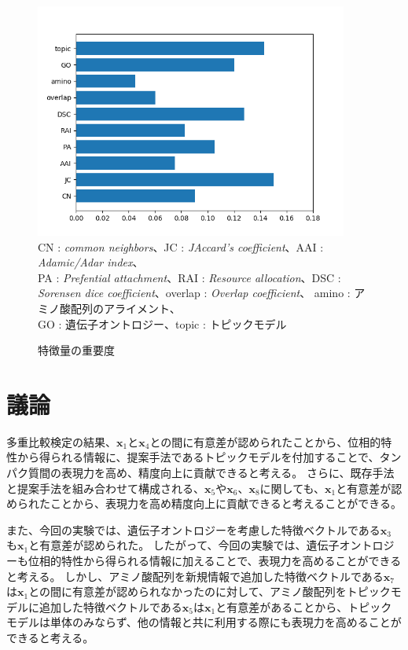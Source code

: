 \documentclass[titlepage,12pt]{jreport}
\begin{document}
\begin{figure}[htbp]
	\begin{center}
	\caption{特徴量の重要度}
		\includegraphics[width = 103mm]{img/feature_importance.png}
	\label{fig:feature-importance}
		\\ {\footnotesize CN : {\it common neighbors}、JC : {\it JAccard's coefficient}、AAI : {\it Adamic/Adar index}、\\PA : {\it Prefential attachment}、RAI : {\it Resource allocation}、DSC : {\it Sorensen dice coefficient}、overlap : {\it Overlap coefficient}、 amino : アミノ酸配列のアライメント、\\GO : 遺伝子オントロジー、topic : トピックモデル}
	\end{center}
\end{figure}

\section{議論\label{discussion}}
多重比較検定の結果、$\bm{x}_1$と$\bm{x}_4$との間に有意差が認められたことから、位相的特性から得られる情報に、提案手法であるトピックモデルを付加することで、タンパク質間の表現力を高め、精度向上に貢献できると考える。 さらに、既存手法と提案手法を組み合わせて構成される、$\bm{x}_5$や$\bm{x}_6$、$\bm{x}_8$に関しても、$\bm{x}_1$と有意差が認められたことから、表現力を高め精度向上に貢献できると考えることができる。

また、今回の実験では、遺伝子オントロジーを考慮した特徴ベクトルである$\bm{x}_3$も$\bm{x}_1$と有意差が認められた。  したがって、今回の実験では、遺伝子オントロジーも位相的特性から得られる情報に加えることで、表現力を高めることができると考える。 しかし、アミノ酸配列を新規情報で追加した特徴ベクトルである$\bm{x}_7$は$\bm{x}_1$との間に有意差が認められなかったのに対して、アミノ酸配列をトピックモデルに追加した特徴ベクトルである$\bm{x}_5$は$\bm{x}_1$と有意差があることから、トピックモデルは単体のみならず、他の情報と共に利用する際にも表現力を高めることができると考える。
\end{document}
